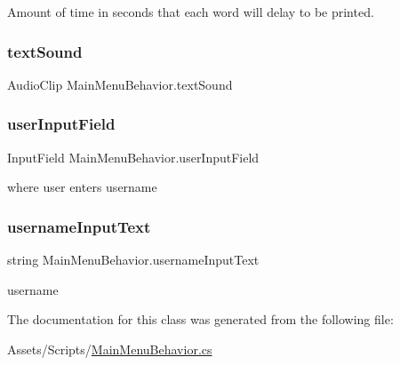 Amount of time in seconds that each word will delay to be printed. 

\mbox{\label{class_main_menu_behavior_ac27a647f3d33f8f028673a5f3dfff869}} 
\subsubsection{\texorpdfstring{textSound}{textSound}}
{\footnotesize\ttfamily Audio\+Clip Main\+Menu\+Behavior.\+text\+Sound}

\mbox{\label{class_main_menu_behavior_a377e447f108f5c58abc88de267d2f15a}} 
\subsubsection{\texorpdfstring{userInputField}{userInputField}}
{\footnotesize\ttfamily Input\+Field Main\+Menu\+Behavior.\+user\+Input\+Field}



where user enters username 

\mbox{\label{class_main_menu_behavior_a73338f524bbbf5b8637e12dd911a04f5}} 
\subsubsection{\texorpdfstring{usernameInputText}{usernameInputText}}
{\footnotesize\ttfamily string Main\+Menu\+Behavior.\+username\+Input\+Text\hspace{0.3cm}{\ttfamily [static]}}



username 



The documentation for this class was generated from the following file\+:\begin{DoxyCompactItemize}
\item 
Assets/\+Scripts/\mbox{\hyperlink{_main_menu_behavior_8cs}{Main\+Menu\+Behavior.\+cs}}\end{DoxyCompactItemize}
